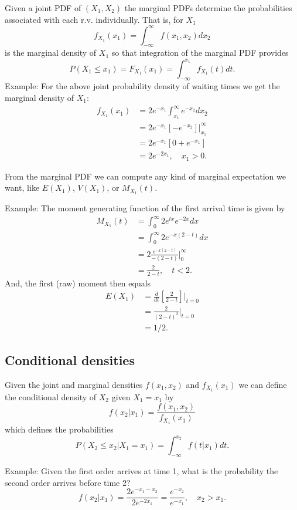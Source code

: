 \documentclass[
]{book}
\begin{document}
Given a joint PDF of \((X_1, X_2)\) the marginal PDFs determine the probabilities associated with each r.v. individually. That is, for \(X_1\)
\[f_{X_1}(x_1) = \int_{-\infty}^\infty f(x_1, x_2) dx_2\]
is the marginal density of \(X_1\) so that integration of the marginal PDF provides
\[P(X_1\leq x_1) = F_{X_1}(x_1) = \int_{-\infty}^{x_1} f_{X_1}(t)dt.\]
Example: For the above joint probability density of waiting times we get the marginal density of \(X_1\):
\begin{align*}
f_{X_1}(x_1) &=  2e^{-x_1}\int_{x_1}^{\infty}e^{-x_2}dx_2\\
& = 2e^{-x_1}[-e^{-x_2}]|_{x_1}^\infty\\
& = 2e^{-x_1}[0 + e^{-x_1}]\\
& = 2e^{-2x_1}, \quad x_1>0.
\end{align*}

From the marginal PDF we can compute any kind of marginal expectation we want, like \(E(X_1)\), \(V(X_1)\), or \(M_{X_1}(t)\).

Example: The moment generating function of the first arrival time is given by
\begin{align*}
M_{X_1}(t) &= \int_{0}^\infty 2e^{tx}e^{-2x}dx\\
& = \int_{0}^\infty 2e^{-x(2-t)}dx \\
& = 2\frac{e^{-x(2-t)}}{-(2-t)}|_{0}^\infty\\
& = \frac{2}{2-t}, \quad t<2.
\end{align*}
And, the first (raw) moment then equals
\begin{align*}
E(X_1) &= \frac{d}{dt}[\frac{2}{2-t}]|_{t=0}\\
&= \frac{2}{(2-t)^2}|_{t=0}\\
& = 1/2.
\end{align*}

\hypertarget{conditional-densities}{%
\subsection{Conditional densities}\label{conditional-densities}}

Given the joint and marginal densities \(f(x_1, x_2)\) and \(f_{X_1}(x_1)\) we can define the conditional density of \(X_2\) given \(X_1=x_1\) by
\[f(x_2|x_1) = \frac{f(x_1, x_2)}{f_{X_1}(x_1)}\]
which defines the probabilities
\[P(X_2\leq x_2|X_1=x_1) = \int_{-\infty}^{x_2} f(t|x_1)dt.\]

Example: Given the first order arrives at time 1, what is the probability the second order arrives before time 2?
\[f(x_2|x_1) = \frac{2e^{-x_1-x_2}}{2e^{-2x_1}} = \frac{e^{-x_2}}{e^{-x_1}}, \quad x_2>x_1.\]
\end{document}

